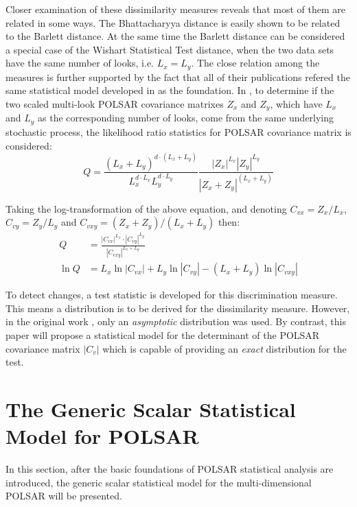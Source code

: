 \documentclass[journal]{IEEEtran}
\begin{document}
Closer examination of these dissimilarity measures reveals that most of them are related in some ways. %
The Bhattacharyya distance is easily shown to be related to the Barlett distance.
At the same time the Barlett distance can be considered a special case of the Wishart Statistical Test distance,
  when the two data sets have the same number of looks, i.e. $L_x=L_y$.
The close relation among the measures is further supported by the fact that
  all of their publications refered the same statistical model developed in \cite{Conradsen_2003_TGRS_4} as the foundation.
In \cite{Conradsen_2003_TGRS_4}, to determine if the two scaled multi-look POLSAR covariance matrixes $Z_x$ and $Z_y$,
  which have $L_x$ and $L_y$ as the corresponding number of looks,
  come from the same underlying stochastic process,
the likelihood ratio statistics for POLSAR covariance matrix is considered:  
\begin{equation*}
  Q = \frac{(L_x+L_y)^{d \cdot (L_x+L_y)}}{L_x^{d \cdot L_x} L_y^{d \cdot L_y}} \frac{|Z_x|^{L_x} |Z_y|^{L_y} }{|Z_x+Z_y|^{(L_x+L_y)}}
\end{equation*}

Taking the log-transformation of the above equation, and denoting $C_{vx} = Z_x / L_x$, $C_{vy} = Z_y / L_y$ and $C_{vxy} = (Z_x + Z_y)/(L_x + L_y)$ then:
{\small
\begin{align}
  Q &= \frac{|C_{vx}|^{L_x} \cdot |C_{vy}|^{L_y} }{|C_{vxy}|^{L_x + L_y}} \label{eqn:ori_likelyhood_stats} \\
  \ln Q &= L_x \ln |C_{vx}| + L_y \ln |C_{vy}| - (L_x + L_y) \ln |C_{vxy}| \label{eqn:log_likelyhood_stats}
\end{align}
}

To detect changes, a test statistic is developed for this discrimination measure.
This means a distribution is to be derived for the dissimilarity measure.
However, in the original work \cite{Conradsen_2003_TGRS_4}, only an \textit{asymptotic} distribution was used.
By contrast, this paper will propose a statistical model for the determinant of the POLSAR covariance matrix $|C_v|$
  which is capable of providing an \textit{exact} distribution for the test.

\section{The Generic Scalar Statistical Model for POLSAR}  
\label{sec:theoretical_model}

In this section, after the basic foundations of POLSAR statistical analysis are introduced,
  the generic scalar statistical model for the multi-dimensional POLSAR will be presented.
\end{document}
